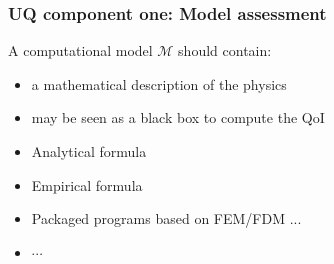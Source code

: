 \begin{frame}
\frametitle{UQ component one: Model assessment}
\begin{definition}
  A computational model $\mathcal{M}$ should contain:
    \begin{itemize}
        \item a \alert{mathematical description} of the physics 
        \item may be seen as a \alert{black box} to compute the QoI
    \end{itemize}
\end{definition}

\bigskip
\begin{itemize}
    \item Analytical formula 
    \item Empirical formula 
    \item Packaged programs based on FEM/FDM ...
    \item $\cdots$
\end{itemize}

\end{frame}


